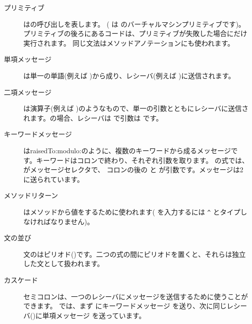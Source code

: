 \documentclass[a4paper,10pt,twoside]{book}
\begin{document}
\begin{description}
\item[プリミティブ] はの呼び出しを表します。
	( は  のバーチャルマシンプリミティブです)。
	プリミティブの後ろにあるコードは、プリミティブが失敗した場合にだけ実行されます。
	同じ文法はメソッドアノテーションにも使われます。

\item[単項メッセージ] は単一の単語(例えば )から成り、レシーバ(例えば )に送信されます。

\item[二項メッセージ] は演算子(例えば \ct{+})のようなもので、単一の引数とともにレシーバに送信されます。の場合、レシーバは  で引数は  です。

\item[キーワードメッセージ] はraisedTo:modulo:のように、複数のキーワードから成るメッセージです。キーワードはコロンで終わり、それぞれ引数を取ります。  の式では、 がメッセージセレクタで、 コロンの後の と  が引数です。メッセージは2に送られています。

\item[メソッドリターン] \ct{^}はメソッドから値をするために使われます(\ct{^} を入力するには \verb|^| とタイプしなければなりません)。

\item[文の並び] 文のはピリオド()です。二つの式の間にピリオドを置くと、それらは独立した文として扱われます。

\item[カスケード] セミコロンは、一つのレシーバにメッセージを送信するために使うことができます。 では、まず  にキーワードメッセージ  を送り、次に同じレシーバ()に単項メッセージ  を送っています。

\end{description}
\end{document}
